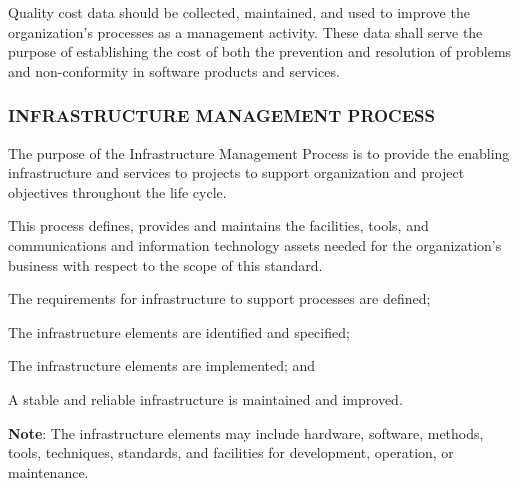 \begin{adjustwidth}{2em}{0pt}
\begin{compactenum}
\begin{compactenum}
						\item Quality cost data should be collected, maintained, and used to improve the organization's processes as a management activity. These data shall serve the purpose of establishing the cost of both the prevention and resolution of problems and non-conformity in software products and services.
					
					\end{compactenum}

				\end{compactenum}

			\end{adjustwidth}
		
		\newpage
		\subsubsection{INFRASTRUCTURE MANAGEMENT PROCESS \label{proc:infrastructure_management_process}}

			\begin{adjustwidth}{2em}{0pt} 

				The purpose of the Infrastructure Management Process is to provide the enabling infrastructure and services to projects to support organization and project objectives throughout the life cycle.
				
				This process defines, provides and maintains the facilities, tools, and communications and information technology assets needed for the organization's business with respect to the scope of this standard.

			\end{adjustwidth}

			\begin{adjustwidth}{2em}{0pt} 

				\begin{compactitem}

					\item The requirements for infrastructure to support processes are defined;

					\item The infrastructure elements are identified and specified;

					\item The infrastructure elements are implemented; and

					\item A stable and reliable infrastructure is maintained and improved.

				\end{compactitem}

				{\bf Note}: The infrastructure elements may include hardware, software, methods, tools, techniques, standards, and facilities for development, operation, or maintenance. 

			\end{adjustwidth}

